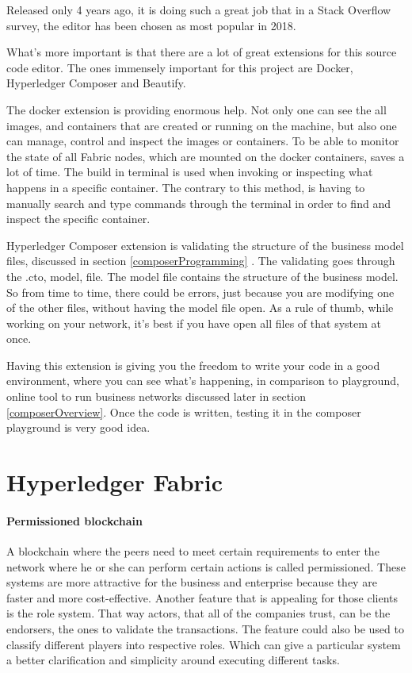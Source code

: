 \documentclass[a4paper,11pt]{report}
\begin{document}
Released only 4 years ago, it is doing such a great job that in a Stack Overflow survey, the editor has been chosen as most popular in 2018.\cite{stackoverflow}

What’s more important is that there are a lot of great extensions for this source code editor. The ones immensely important for this project are Docker, Hyperledger Composer and Beautify. 

The docker extension is providing enormous help. Not only one can see the all images, and containers that are created or running on the machine, but also one can manage, control and inspect the images or containers. To be able to monitor the state of all Fabric nodes, which are mounted on the docker containers, saves a lot of time. The build in terminal is used when invoking or inspecting what happens in a specific container. The contrary to this method, is having to manually search and type commands through the terminal in order to find and inspect the specific container. 

Hyperledger Composer extension is validating the structure of the business model files, discussed in section \ref{composerProgramming} . The validating goes through the .cto, model, file. The model file contains the structure of the business model. So from time to time, there could be errors, just because you are modifying one of the other files, without having the model file open. As a rule of thumb, while working on your network, it’s best if you have open all files of that system at once.
  
Having this extension is giving you the freedom to write your code in a good environment, where you can see what’s happening, in comparison to playground, online tool to run business networks discussed later in section \ref{composerOverview}. Once the code is written, testing it in the composer playground is very good idea. 

\chapter{Hyperledger Fabric}
\label{hplFabric}

\subsubsection{Permissioned blockchain}
A blockchain where the peers need to meet certain requirements to enter the network where he or she can perform certain actions is called permissioned. These systems are more attractive for the business and enterprise because they are faster and more cost-effective. Another feature that is appealing for those clients is the role system. That way actors, that all of the companies trust, can be the endorsers, the ones to validate the transactions. The feature could also be used to classify different players into respective roles. Which can give a particular system a better clarification and simplicity around executing different tasks. 
\end{document}
